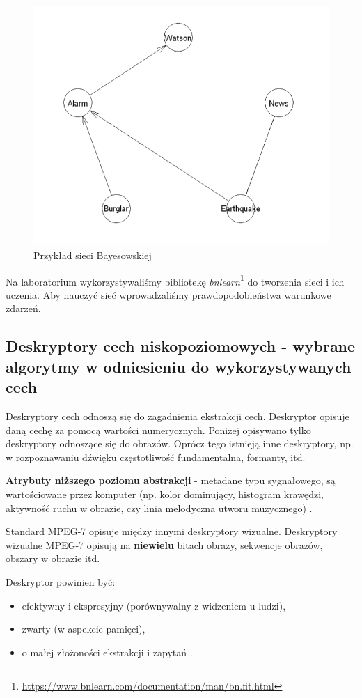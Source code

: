 \documentclass[wi]{zut}
\begin{document}
\begin{figure}[H]
    \centering
    \includegraphics[width=0.5\linewidth]{images/bayesian.png}
    \caption{Przykład sieci Bayesowskiej}
    \label{fig:bayesian}
\end{figure}


Na laboratorium wykorzystywaliśmy bibliotekę \emph{bnlearn}\footnote{\url{https://www.bnlearn.com/documentation/man/bn.fit.html}} do tworzenia sieci i ich uczenia. Aby nauczyć sieć wprowadzaliśmy prawdopodobieństwa warunkowe zdarzeń.
\question

\subsection{Deskryptory cech niskopoziomowych - wybrane algorytmy w odniesieniu do wykorzystywanych cech}

Deskryptory cech odnoszą się do zagadnienia ekstrakcji cech. Deskryptor opisuje daną cechę za pomocą wartości numerycznych. Poniżej opisywano tylko deskryptory odnoszące się do obrazów. Oprócz tego istnieją inne deskryptory, np. w rozpoznawaniu dźwięku częstotliwość fundamentalna, formanty, itd.

\textbf{Atrybuty niższego poziomu abstrakcji} - metadane typu sygnałowego, są wartościowane przez komputer (np. kolor dominujący, histogram krawędzi, aktywność ruchu w obrazie, czy linia melodyczna utworu muzycznego) \cite{Frejlichowski2020}.

Standard MPEG-7 opisuje między innymi deskryptory wizualne. Deskryptory wizualne MPEG-7 opisują na \textbf{niewielu} bitach obrazy, sekwencje obrazów, obszary w obrazie itd. 

Deskryptor powinien być:

\begin{itemize}
    \item efektywny i ekspresyjny (porównywalny z widzeniem u ludzi),
    \item zwarty (w aspekcie pamięci),
    \item o małej złożoności ekstrakcji i zapytań \cite{Frejlichowski2020}.
\end{itemize}
\end{document}
